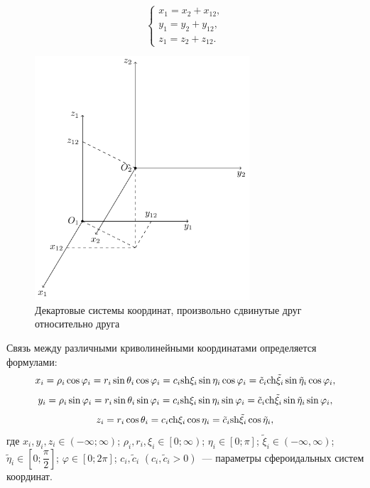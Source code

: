 \begin{equation}\label{eq:1:1}
\left\{ {\begin{array}{*{20}{l}}
{{x_1} = {x_2} + {x_{12}},}\\
{{y_1} = {y_2} + {y_{12}},}\\
{{z_1} = {z_2} + {z_{12}}.}
\end{array}} \right.
\end{equation}
\begin{figure}
\centering\includegraphics[width=8cm]{cartesian.pdf}
\caption{Декартовые системы координат, произвольно сдвинутые друг относительно друга}
\end{figure}
Связь между различными криволинейными координатами определяется формулами:
\begin{equation*}
{x_i} = {\rho _i}\cos {\varphi _i} = {r_i}\sin {\theta _i}\cos {\varphi _i} = {c_i}{\mathop{\rm sh}\nolimits} {\xi _i}\sin {\eta _i}\cos {\varphi _i} = {\tilde c_i}{\mathop{\rm ch}\nolimits} {\tilde \xi _i}\sin {\tilde \eta _i}\cos {\varphi _i},
\end{equation*}
\begin{equation*}
{y_i} = {\rho _i}\sin {\varphi _i} = {r_i}\sin {\theta _i}\sin {\varphi _i} = {c_i}{\mathop{\rm sh}\nolimits} {\xi _i}\sin {\eta _i}\sin {\varphi _i} = {\tilde c_i}{\mathop{\rm ch}\nolimits} {\tilde \xi _i}\sin {\tilde \eta _i}\sin {\varphi _i},
\end{equation*}
\begin{equation}\label{eq:1:2}
{z_i} = {r_i}\cos {\theta _i} = {c_i}{\mathop{\rm ch}\nolimits} {\xi _i}\cos {\eta _i} = {\tilde c_i}{\mathop{\rm sh}\nolimits} {\tilde \xi _i}\cos {\tilde \eta _i},
\end{equation}
\noindent где ${x_i},{y_i},{z_i} \in \left( { - \infty ;\infty } \right)$; ${\rho _i},{r_i},{\xi _i} \in \left[ {\left. {0;\infty } \right)} \right.$; ${\eta _i} \in \left[ {0;\pi } \right]$; ${\tilde \xi _i} \in \left( { - \infty ,\infty } \right)$; ${\tilde \eta _i} \in \left[ {0;\dfrac{\pi }{2}} \right]$; $\varphi  \in \left[ {0;2\pi } \right]$; ${c_i},{\tilde c_i}$ $\left( {{c_i},{{\tilde c}_i} > 0} \right)$~--- параметры сфероидальных систем координат.


